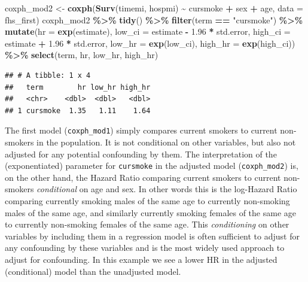 \documentclass[
]{book}
\newenvironment{Shaded}{\begin{snugshade}}{\end{snugshade}}
\newcommand{\AttributeTok}[1]{\textcolor[rgb]{0.13,0.29,0.53}{#1}}
\newcommand{\FloatTok}[1]{\textcolor[rgb]{0.00,0.00,0.81}{#1}}
\newcommand{\FunctionTok}[1]{\textcolor[rgb]{0.13,0.29,0.53}{\textbf{#1}}}
\newcommand{\NormalTok}[1]{#1}
\newcommand{\OtherTok}[1]{\textcolor[rgb]{0.56,0.35,0.01}{#1}}
\newcommand{\SpecialCharTok}[1]{\textcolor[rgb]{0.81,0.36,0.00}{\textbf{#1}}}
\newcommand{\StringTok}[1]{\textcolor[rgb]{0.31,0.60,0.02}{#1}}
\begin{document}
\begin{Shaded}
\begin{Highlighting}[]
\NormalTok{coxph\_mod2 }\OtherTok{\textless{}{-}} \FunctionTok{coxph}\NormalTok{(}\FunctionTok{Surv}\NormalTok{(timemi, hospmi) }\SpecialCharTok{\textasciitilde{}}\NormalTok{ cursmoke }\SpecialCharTok{+}\NormalTok{ sex }\SpecialCharTok{+}\NormalTok{ age, }
                    \AttributeTok{data =}\NormalTok{ fhs\_first)}
\NormalTok{coxph\_mod2 }\SpecialCharTok{\%\textgreater{}\%} 
  \FunctionTok{tidy}\NormalTok{() }\SpecialCharTok{\%\textgreater{}\%} 
  \FunctionTok{filter}\NormalTok{(term }\SpecialCharTok{==} \StringTok{"cursmoke"}\NormalTok{) }\SpecialCharTok{\%\textgreater{}\%} 
  \FunctionTok{mutate}\NormalTok{(}\AttributeTok{hr =} \FunctionTok{exp}\NormalTok{(estimate),}
         \AttributeTok{low\_ci =}\NormalTok{ estimate }\SpecialCharTok{{-}} \FloatTok{1.96} \SpecialCharTok{*}\NormalTok{ std.error, }
         \AttributeTok{high\_ci =}\NormalTok{ estimate }\SpecialCharTok{+} \FloatTok{1.96} \SpecialCharTok{*}\NormalTok{ std.error, }
         \AttributeTok{low\_hr =} \FunctionTok{exp}\NormalTok{(low\_ci), }
         \AttributeTok{high\_hr =} \FunctionTok{exp}\NormalTok{(high\_ci)) }\SpecialCharTok{\%\textgreater{}\%} 
  \FunctionTok{select}\NormalTok{(term, hr, low\_hr, high\_hr)}
\end{Highlighting}
\end{Shaded}

\begin{verbatim}
## # A tibble: 1 x 4
##   term        hr low_hr high_hr
##   <chr>    <dbl>  <dbl>   <dbl>
## 1 cursmoke  1.35   1.11    1.64
\end{verbatim}

The first model (\texttt{coxph\_mod1}) simply compares current smokers to current non-smokers in the population. It is not conditional on other variables, but also not adjusted for any potential confounding by them. The interpretation of the (exponentiated) parameter for \texttt{cursmoke} in the adjusted model (\texttt{coxph\_mod2}) is, on the other hand, the Hazard Ratio comparing current smokers to current non-smokers \emph{conditional} on age and sex. In other words this is the log-Hazard Ratio comparing currently smoking males of the same age to currently non-smoking males of the same age, and similarly currently smoking females of the same age to currently non-smoking females of the same age. This \emph{conditioning} on other variables by including them in a regression model is often sufficient to adjust for any confounding by these variables and is the most widely used approach to adjust for confounding. In this example we see a lower HR in the adjusted (conditional) model than the unadjusted model.
\end{document}
